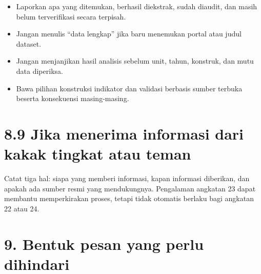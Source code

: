 \documentclass[
  indonesian,
]{article}
\providecommand{\tightlist}{%
  \setlength{\itemsep}{0pt}\setlength{\parskip}{0pt}}
\renewcommand{\subsection}{\section}
\begin{document}
\begin{itemize}
\tightlist
\item
  Laporkan apa yang ditemukan, berhasil diekstrak, sudah diaudit, dan
  masih belum terverifikasi secara terpisah.
\item
  Jangan menulis ``data lengkap'' jika baru menemukan portal atau judul
  dataset.
\item
  Jangan menjanjikan hasil analisis sebelum unit, tahun, konstruk, dan
  mutu data diperiksa.
\item
  Bawa pilihan konstruksi indikator dan validasi berbasis sumber terbuka
  beserta konsekuensi masing-masing.
\end{itemize}

\subsection{8.9 Jika menerima informasi dari kakak tingkat atau
teman}\label{jika-menerima-informasi-dari-kakak-tingkat-atau-teman}

Catat tiga hal: siapa yang memberi informasi, kapan informasi diberikan,
dan apakah ada sumber resmi yang mendukungnya. Pengalaman angkatan 23
dapat membantu memperkirakan proses, tetapi tidak otomatis berlaku bagi
angkatan 22 atau 24.

\section{9. Bentuk pesan yang perlu
dihindari}\label{bentuk-pesan-yang-perlu-dihindari}
\end{document}
